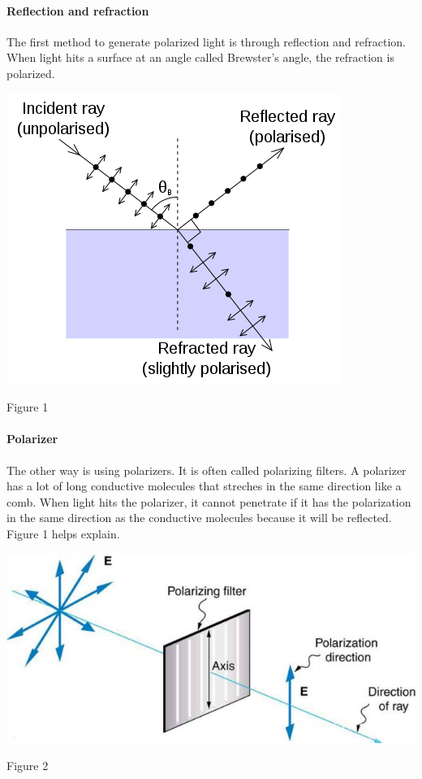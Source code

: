 \documentclass[]{report}
\begin{document}
\paragraph{Reflection and refraction} The first method to generate polarized light is through reflection and refraction. When light hits a surface at an angle called Brewster's angle, the refraction is polarized\cite{David Brewster.(1815)}. \newline\newline
\centerline{\includegraphics[scale=0.8]{figure3.jpg}}\newline
\centerline{Figure 1}
\paragraph{Polarizer} The other way is using polarizers. It is often called polarizing filters. A polarizer has a lot of long conductive molecules that streches in the same direction like a comb. When light hits the polarizer, it cannot penetrate if it has the polarization in the same direction as the conductive molecules because it will be reflected. Figure 1 helps explain.\newline\newline
\centerline{\includegraphics[scale=0.45]{figure1.jpg}}\newline
\centerline{Figure 2}
\newline
\end{document}
